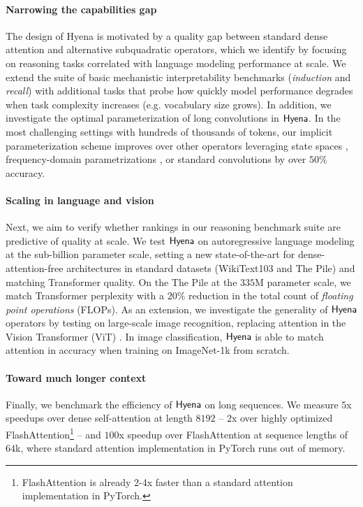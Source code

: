 \paragraph{Narrowing the capabilities gap}
%
The design of {\sf Hyena} is motivated by a quality gap between standard dense attention and alternative subquadratic operators, which we identify by focusing on reasoning tasks correlated with language modeling performance at scale. We extend the suite of basic mechanistic interpretability benchmarks (\textit{induction} and \textit{recall}) with additional tasks that probe how quickly model performance degrades when task complexity increases (e.g. vocabulary size grows). In addition, we investigate the optimal parameterization of long convolutions in ${\sf Hyena}$. In the most challenging settings with hundreds of thousands of tokens, our implicit parameterization scheme improves over other operators leveraging state spaces \citep{gu2021efficiently}, frequency-domain parametrizations \citep{li2020fourier}, or standard convolutions by over $50\%$ accuracy.
%
\paragraph{Scaling in language and vision}
%
Next, we aim to verify whether rankings in our reasoning benchmark suite are predictive of quality at scale. We test ${\sf Hyena}$ on autoregressive language modeling at the sub-billion parameter scale, setting a new state-of-the-art for dense-attention-free architectures in standard datasets ({\sc WikiText103} and {\sc The Pile}) and matching Transformer quality. On the {\sc The Pile} at the $335$M parameter scale, we match Transformer perplexity with a $20\%$ reduction in the total count of \textit{floating point operations} (FLOPs). As an extension, we investigate the generality of ${\sf Hyena}$ operators by testing on large-scale image recognition, replacing attention in the Vision Transformer (ViT) \citep{dosovitskiy2020image}. In image classification, ${\sf Hyena}$ is able to match attention in accuracy when training on ImageNet-1k from scratch.
%
\paragraph{Toward much longer context}
%
Finally, we benchmark the efficiency of ${\sf Hyena}$ on long sequences. We measure $5$x speedups over dense self-attention at length $8192$ -- $2$x over highly optimized FlashAttention\footnote{FlashAttention is already 2-4x faster than a standard attention implementation in PyTorch.} \citep{dao2022flashattention} -- and $100$x speedup over FlashAttention at sequence lengths of $64$k, where standard attention implementation in PyTorch runs out of memory. 